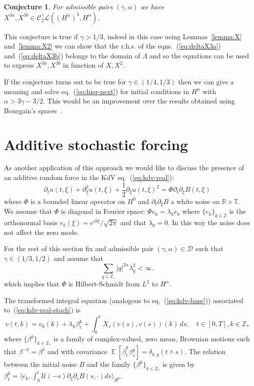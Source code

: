 \documentclass[a4paper,11pt,reqno]{article}
\DeclareMathOperator{\expect}{{\mathbb E}}
\newcommand{\RR}{\mathbb{R}}
\newcommand{\TT}{\mathbb{T}}
\newcommand{\CC}{\mathcal{C}}
\newcommand{\DD}{\mathcal{D}}
\newcommand{\LL}{\mathcal{L}}
\newcommand{\ZZ}{\mathbb{Z}}
\newtheorem{conjecture}[theorem]{Conjecture}
\begin{document}
\begin{conjecture}
For admissible pairs $(\gamma,\alpha)$ we have
$X^{3a},X^{3b} \in \CC_2^\gamma \LL((H^{\alpha})^4,H^{\alpha})$.  
\end{conjecture}
 
This conjecture is true if $\gamma > 1/3$, indeed in this case using
Lemmas~\ref{lemma:X} and~\ref{lemma:X2} we can show that the r.h.s. of
the eqns.~(\ref{eq:deltaX3a}) and~(\ref{eq:deltaX3b}) belongs to the
domain of $\Lambda$ and so the equations can be used to express
$X^{3a},X^{3b}$ in function of $X,X^2$. 

If the conjecture turns out to be true for $\gamma \in ( 1/4,1/3)$ then we can give a
meaning and solve eq.~(\ref{eq:hier-next}) for initial conditions in
$H^\alpha$ with $\alpha>3\gamma-3/2$. This would be an improvement
over the results obtained using Bourgain's spaces~\cite{MR1215780,MR1329387}.




\section{Additive stochastic forcing}
\label{sec:stoch}
As another application of this approach we would like to discuss the presence of an additive random force in the KdV eq.~(\ref{eq:kdv-real}):
\begin{equation}
  \label{eq:kdv-real-stoch}
\partial_t u(t,\xi) + \partial^3_\xi u(t,\xi) +
\frac12 \partial_\xi u(t,\xi)^2 = \Phi \partial_t  \partial_\xi B(t,\xi)
\end{equation}
where $\Phi$ is a bounded linear operator on $H^0$ and
$\partial_t \partial_\xi B$ a white noise on $\RR\times\TT$.
We assume that $\Phi$ is diagonal in Fourier space: $\Phi e_k =
\lambda_k e_k$ where $\{e_k \}_{k\in\ZZ}$ is the orthonormal basis
$e_k(\xi) = e^{ik\xi}/\sqrt{2\pi}$ and that $\lambda_0 = 0$.  In this
way the noise does not affect the zero mode.

For the rest of this section  fix and admissible pair $(\gamma,\alpha)
\in \DD$ such that $\gamma \in (1/3,1/2)$ and assume that
\begin{equation}
  \label{eq:lambda-bound}
\sum_{q \in \ZZ_*}  |q|^{2\alpha} \lambda_q^2 < \infty.
\end{equation}
which implies that $\Phi$ is  Hilbert-Schmidt  from $L^2$ to
$H^\alpha$.

The transformed integral equation (analogous to
eq.~(\ref{eq:kdv-base})) associated to~(\ref{eq:kdv-real-stoch}) is
\begin{equation}
  \label{eq:kdv-base-stoch}
 v(t,k) =   v_0(k) + \lambda_k \beta^k_t +  \int_0^t \dot X_s(
  v(s), v(s))(k) \, ds, \quad t \in [0,T], k \in \ZZ_* 
\end{equation}
where $\{\beta^k_\cdot\}_{k \in \ZZ_*}$ is a family of 
complex-valued, zero mean, Brownian motions such that $\beta^{-k} =
\overline{\beta^k}$ and with covariance
$\expect[\overline \beta^k_t \beta^q_s] = \delta_{k,q} (t\wedge s)$. 
The relation between the initial noise $B$ and the family $\{\beta^k_\cdot\}_{k \in \ZZ_*}$ is given by 
$
\beta^k_t = \langle e_k, \int_0^t \mathcal{U}(-s) \partial_\xi \partial_s B(s,\cdot) ds \rangle_{H^0} 
$.
\end{document}
